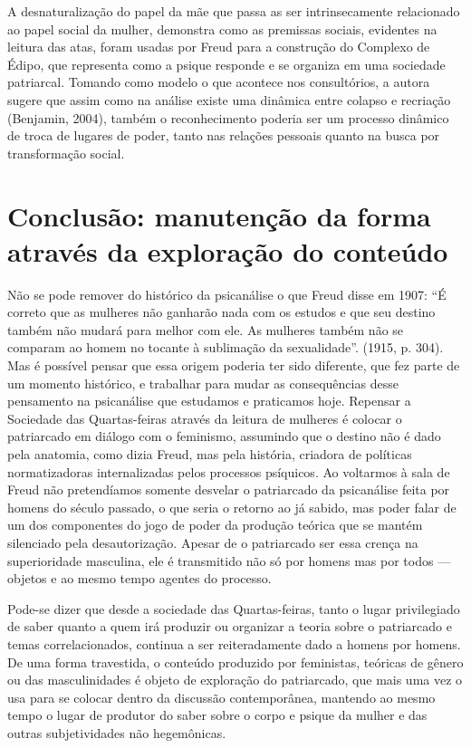 A desnaturalização do papel da mãe que passa as ser intrinsecamente
relacionado ao papel social da mulher, demonstra como as premissas
sociais, evidentes na leitura das atas, foram usadas por Freud para a
construção do Complexo de Édipo, que representa como a psique responde e
se organiza em uma sociedade patriarcal. Tomando como modelo o que
acontece nos consultórios, a autora sugere que assim como na análise
existe uma dinâmica entre colapso e recriação (Benjamin, 2004), também o
reconhecimento poderia ser um processo dinâmico de troca de lugares de
poder, tanto nas relações pessoais quanto na busca por transformação
social.

\section{Conclusão: manutenção da forma através da exploração do
conteúdo}

Não se pode remover do histórico da psicanálise o que Freud disse em
1907: ``É correto que as mulheres não ganharão nada com os estudos e que
seu destino também não mudará para melhor com ele. As mulheres também
não se comparam ao homem no tocante à sublimação da sexualidade''.
(1915, p. 304). Mas é possível pensar que essa origem poderia ter sido
diferente, que fez parte de um momento histórico, e trabalhar para mudar
as consequências desse pensamento na psicanálise que estudamos e
praticamos hoje. Repensar a Sociedade das Quartas-feiras através da
leitura de mulheres é colocar o patriarcado em diálogo com o feminismo,
assumindo que o destino não é dado pela anatomia, como dizia Freud, mas
pela história, criadora de políticas normatizadoras internalizadas pelos
processos psíquicos. Ao voltarmos à sala de Freud não pretendíamos
somente desvelar o patriarcado da psicanálise feita por homens do século
passado, o que seria o retorno ao já sabido, mas poder falar de um dos
componentes do jogo de poder da produção teórica que se mantém
silenciado pela desautorização. Apesar de o patriarcado ser essa crença
na superioridade masculina, ele é transmitido não só por homens mas por
todos --- objetos e ao mesmo tempo agentes do processo.

Pode-se dizer que desde a sociedade das Quartas-feiras, tanto o lugar
privilegiado de saber quanto a quem irá produzir ou organizar a teoria
sobre o patriarcado e temas correlacionados, continua a ser
reiteradamente dado a homens por homens. De uma forma travestida, o
conteúdo produzido por feministas, teóricas de gênero ou das
masculinidades é objeto de exploração do patriarcado, que mais uma vez o
usa para se colocar dentro da discussão contemporânea, mantendo ao mesmo
tempo o lugar de produtor do saber sobre o corpo e psique da mulher e
das outras subjetividades não hegemônicas.

